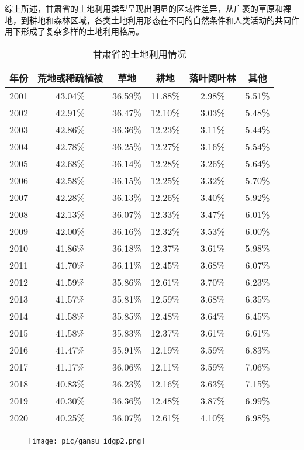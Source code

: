 \documentclass{article}
\begin{document}
	
		综上所述，甘肃省的土地利用类型呈现出明显的区域性差异，从广袤的草原和裸地，到耕地和森林区域，各类土地利用形态在不同的自然条件和人类活动的共同作用下形成了复杂多样的土地利用格局。
		
		\begin{table}[H]
			\centering
			\begin{tabular}{|c|c|c|c|c|c|}
				\hline
				年份 & 荒地或稀疏植被 & 草地 & 耕地 & 落叶阔叶林 & 其他 \\
				\hline
				2001 & 43.04\% & 36.59\% & 11.88\% & 2.98\% & 5.51\% \\
				2002 & 42.91\% & 36.47\% & 12.10\% & 3.03\% & 5.48\% \\
				2003 & 42.86\% & 36.36\% & 12.23\% & 3.11\% & 5.44\% \\
				2004 & 42.78\% & 36.25\% & 12.27\% & 3.16\% & 5.54\% \\
				2005 & 42.68\% & 36.14\% & 12.28\% & 3.26\% & 5.64\% \\
				2006 & 42.58\% & 36.15\% & 12.25\% & 3.32\% & 5.70\% \\
				2007 & 42.28\% & 36.13\% & 12.26\% & 3.40\% & 5.92\% \\
				2008 & 42.13\% & 36.07\% & 12.33\% & 3.47\% & 6.01\% \\
				2009 & 42.00\% & 36.16\% & 12.32\% & 3.53\% & 6.00\% \\
				2010 & 41.86\% & 36.18\% & 12.37\% & 3.61\% & 5.98\% \\
				2011 & 41.70\% & 36.11\% & 12.45\% & 3.68\% & 6.07\% \\
				2012 & 41.59\% & 35.86\% & 12.61\% & 3.70\% & 6.23\% \\
				2013 & 41.57\% & 35.81\% & 12.59\% & 3.68\% & 6.35\% \\
				2014 & 41.58\% & 35.85\% & 12.48\% & 3.64\% & 6.45\% \\
				2015 & 41.58\% & 35.83\% & 12.37\% & 3.61\% & 6.61\% \\
				2016 & 41.47\% & 35.91\% & 12.19\% & 3.59\% & 6.83\% \\
				2017 & 41.17\% & 36.06\% & 12.11\% & 3.59\% & 7.06\% \\
				2018 & 40.83\% & 36.23\% & 12.16\% & 3.63\% & 7.15\% \\
				2019 & 40.30\% & 36.36\% & 12.48\% & 3.87\% & 6.99\% \\
				2020 & 40.25\% & 36.07\% & 12.61\% & 4.10\% & 6.98\% \\
				\hline
			\end{tabular}
			\caption{甘肃省的土地利用情况}
		\end{table}
	\begin{figure}[H]  %
			\centering
			\texttt{[image: pic/gansu\_idgp2.png]} %
		\end{figure}
		
\end{document}
